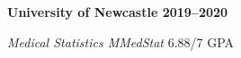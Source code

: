 \textbf{University of Newcastle \hfill 2019--2020} \par
\textit{Medical Statistics MMedStat} 6.88/7 GPA \par